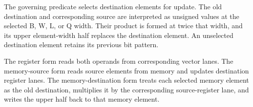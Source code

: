 The governing predicate selects destination elements for update. The old
destination and corresponding source are interpreted as unsigned values at the
selected B, W, L, or Q width. Their product is formed at twice that width, and
its upper element-width half replaces the destination element. An unselected
destination element retains its previous bit pattern.

The register form reads both operands from corresponding vector lanes. The
memory-source form reads source elements from memory and updates destination
register lanes. The memory-destination form treats each selected memory element
as the old destination, multiplies it by the corresponding source-register
lane, and writes the upper half back to that memory element.
